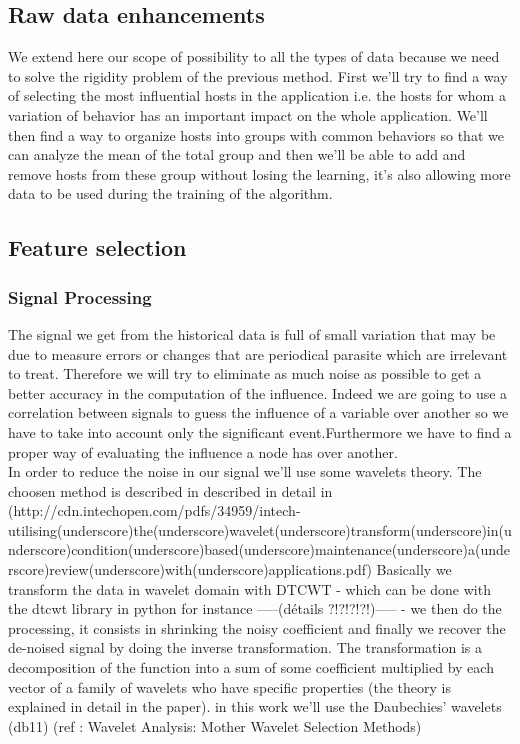 \documentclass[10pt,a4paper,oneside]{article}
\begin{document}
\begin{multicols}{2}
\section{Raw data enhancements}
We extend here our scope of possibility to all the types of data because we need to solve the rigidity problem of the previous method. First we'll try to find a way of selecting the most influential hosts in the application i.e. the hosts for whom a variation of behavior has an important impact on the whole application. We'll then find a way to organize hosts into groups with common behaviors so that we can analyze the mean of the total group and then we'll be able to add and remove hosts from these group without losing the learning, it's also allowing more data to be used during the training of the algorithm.
\subsection{Feature selection}
\subsubsection{Signal Processing}
The signal we get from the historical data is full of small variation that may be due to measure errors or changes that are periodical parasite which are irrelevant to treat. Therefore we will try to eliminate as much noise as possible to get a better accuracy in the computation of the influence. Indeed we are going to use a correlation between signals to guess the influence of a variable over another so we have to take into account only the significant event.Furthermore we have to find a proper way of evaluating the influence a node has over another.
\\
In order to reduce the noise in our signal we'll use some wavelets theory. The choosen method is described in described in detail in (http://cdn.intechopen.com/pdfs/34959/intech-utilising(underscore)the(underscore)wavelet(underscore)transform(underscore)in(underscore)condition(underscore)based(underscore)maintenance(underscore)a(underscore)review(underscore)with(underscore)applications.pdf)
Basically we transform the data in wavelet domain with DTCWT - which can be done with the dtcwt library in python for instance -----(détails ?!?!?!?!)----- - we then do the processing, it consists in shrinking the noisy coefficient and finally we recover the de-noised signal by doing the inverse transformation.
The transformation is a decomposition of the function into a sum of some coefficient multiplied by each vector of a family of wavelets who have specific properties (the theory is explained in detail in the paper). in this work we'll use the Daubechies' wavelets (db11) (ref : Wavelet Analysis: Mother Wavelet Selection Methods)

\end{multicols}
\end{document}
